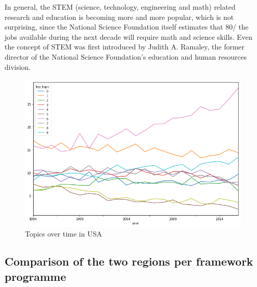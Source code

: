 \documentclass[12pt]{report}
\begin{document}
In general, the STEM (science, technology, engineering and math) related
research and education is becoming more and more popular, which is not
surprising, since the National Science Foundation itself estimates that 80/%
the jobs available during the next decade will require math and science skills.
Even the concept of STEM was first introduced by Judith A. Ramaley, the former
director of the National Science Foundation's education and human resources
division.
\begin{center}
\begin{figure}
\includegraphics[width=1.0\textwidth]
{figs/topic-evolution-usa.png}
\caption{Topics over time in USA}
\end{figure}
\end{center}

\subsection{Comparison of the two regions per framework programme}
\end{document}
